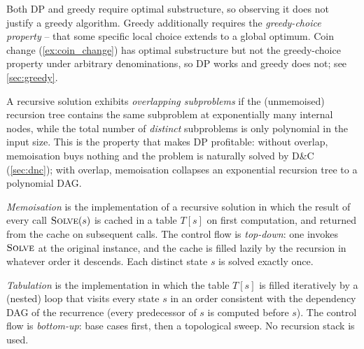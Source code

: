 \begin{remark}
Both DP and greedy require optimal substructure, so observing it does not justify a greedy algorithm. Greedy additionally requires the \emph{greedy-choice property} -- that some specific local choice extends to a global optimum. Coin change (\cref{ex:coin_change}) has optimal substructure but not the greedy-choice property under arbitrary denominations, so DP works and greedy does not; see \cref{sec:greedy}.
\end{remark}

\begin{definition}
\label{def:overlapping_subproblems}
A recursive solution exhibits \emph{overlapping subproblems} if the (unmemoised) recursion tree contains the same subproblem at exponentially many internal nodes, while the total number of \emph{distinct} subproblems is only polynomial in the input size. This is the property that makes DP profitable: without overlap, memoisation buys nothing and the problem is naturally solved by D\&C (\cref{sec:dnc}); with overlap, memoisation collapses an exponential recursion tree to a polynomial DAG.
\end{definition}

\begin{definition}
\label{def:memoisation}
\emph{Memoisation} is the implementation of a recursive solution in which the result of every call $\textsc{Solve}(s)$ is cached in a table $T[s]$ on first computation, and returned from the cache on subsequent calls. The control flow is \emph{top-down}: one invokes $\textsc{Solve}$ at the original instance, and the cache is filled lazily by the recursion in whatever order it descends. Each distinct state $s$ is solved exactly once.
\end{definition}

\begin{definition}
\label{def:tabulation}
\emph{Tabulation} is the implementation in which the table $T[s]$ is filled iteratively by a (nested) loop that visits every state $s$ in an order consistent with the dependency DAG of the recurrence (every predecessor of $s$ is computed before $s$). The control flow is \emph{bottom-up}: base cases first, then a topological sweep. No recursion stack is used.
\end{definition}

